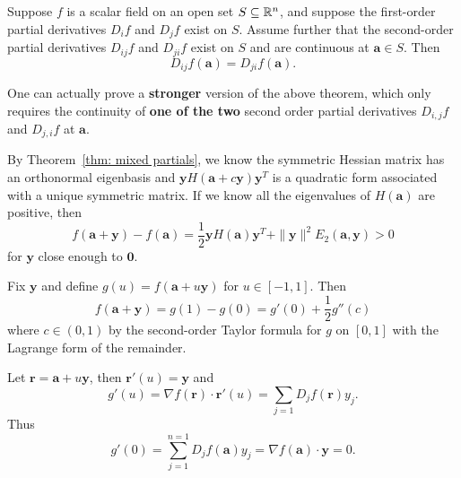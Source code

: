     \begin{theoremenv}\label{thm: mixed partials}
        Suppose \(f\) is a scalar field on an open set \(S\subseteq \mathbb{R}^n\), and suppose
        the first-order partial derivatives \(D_i f\) and \(D_j f\) exist on \(S\).
        Assume further that the second-order partial derivatives \(D_{ij}f\) and
        \(D_{ji}f\) exist on \(S\) and are continuous at \(\bm a\in S\). Then
        \[
            D_{ij}f(\bm a)=D_{ji}f(\bm a).
        \]
    \end{theoremenv}
    \begin{remarkenv}
        One can actually prove a \textbf{stronger} version of the above theorem, which only requires the continuity of \textbf{one of the two} second order partial derivatives \(D_{i,j}f\) and \(D_{j,i}f\) at \(\bm a\).
    \end{remarkenv}
    \begin{lemmaenv}
        By Theorem~\ref{thm: mixed partials}, we know the symmetric Hessian matrix has an orthonormal eigenbasis and $\bm y H(\bm a + c \bm y) \bm y^T$ is a quadratic form associated with a unique symmetric matrix. If we know all the eigenvalues of $H(\bm a)$ are positive, then
        $$ f(\bm a + \bm y) - f(\bm a) = \frac{1}{2} \bm y H(\bm a) \bm y^T + \| \bm y\|^2 E_2(\bm a, \bm y) > 0 $$
        for $\bm y$ close enough to $\bm 0$.
    \end{lemmaenv}
    \begin{proofenv}
        Fix $\bm y$ and define $g(u) = f(\bm a + u\bm y)$ for $u \in [-1,1]$. Then
        $$ f(\bm a + \bm y ) = g(1) - g(0) = g'(0) + \frac{1}{2} g''(c)$$
        where $c\in (0,1)$ by the second-order Taylor formula for $g$ on $[0,1]$ with the Lagrange form of the remainder.

        Let $\bm r = \bm a + u \bm y$, then $\bm r'(u) = \bm y$ and
        $$ g'(u) = \nabla f(\bm r) \cdot \bm r'(u) = \sum_{j=1} D_j f(\bm r) y_j. $$
        Thus
        $$ g'(0) = \sum_{j=1}^{n=1} D_j f(\bm a) y_j = \nabla f(\bm a) \cdot \bm y = 0. $$

    \end{proofenv}
